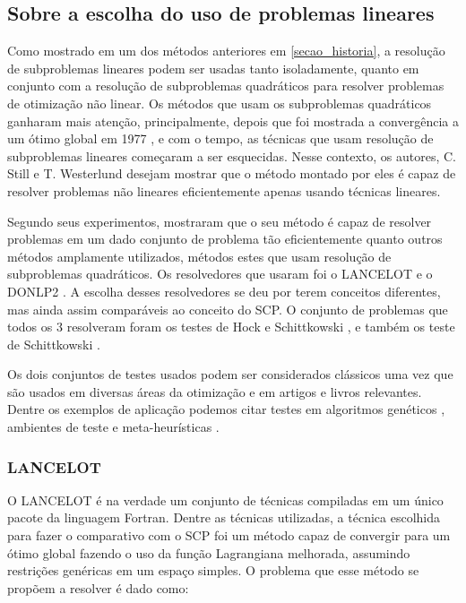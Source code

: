 \subsection{Sobre a escolha do uso de problemas lineares}
Como mostrado em um dos métodos anteriores em \ref{secao_historia}, a resolução de subproblemas
lineares podem ser usadas tanto isoladamente, quanto em conjunto com a resolução de subproblemas
quadráticos para resolver problemas de otimização não linear. Os métodos que usam os subproblemas
quadráticos ganharam mais atenção, principalmente, depois que foi mostrada a convergência a um
ótimo global em 1977 \cite{han1977globally}, e com o tempo, as técnicas que usam resolução de
subproblemas lineares começaram a ser esquecidas. Nesse contexto, os autores, C. Still e
T. Westerlund desejam mostrar que o método montado por eles é capaz de resolver problemas não
lineares eficientemente apenas usando técnicas lineares.

Segundo seus experimentos, mostraram que o seu método é capaz de resolver problemas em um dado
conjunto de problema tão eficientemente quanto outros métodos amplamente utilizados, métodos
estes que usam resolução de subproblemas quadráticos. Os resolvedores que usaram foi o LANCELOT
\cite{conn1991globally} e o DONLP2 \cite{spellucci1999donlp2}. A escolha desses resolvedores se
deu por terem conceitos diferentes, mas ainda assim comparáveis ao conceito do SCP. O conjunto
de problemas que todos os 3 resolveram foram os testes de Hock e Schittkowski \cite{Hock1981}, e
também os teste de Schittkowski \cite{Schittkowski1987}.

Os dois conjuntos de testes usados podem ser considerados clássicos uma vez que são usados em
diversas áreas da otimização e em artigos e livros relevantes. Dentre os exemplos de aplicação
podemos citar testes em algoritmos genéticos \cite{Deb_2000, Joines}, ambientes de teste
\cite{Bongartz_1995} e meta-heurísticas \cite{Gandomi_2012}.

\subsubsection{LANCELOT}
\label{sec_lancelot}
O LANCELOT \cite{conn1991globally} é na verdade um conjunto de técnicas compiladas em um único
pacote da  linguagem Fortran. Dentre as técnicas utilizadas, a técnica escolhida para fazer o
comparativo com o SCP foi um método capaz de convergir para um ótimo global fazendo o uso da
função Lagrangiana melhorada, assumindo restrições genéricas em um espaço simples. O problema
que esse método se propõem a resolver é dado como:



